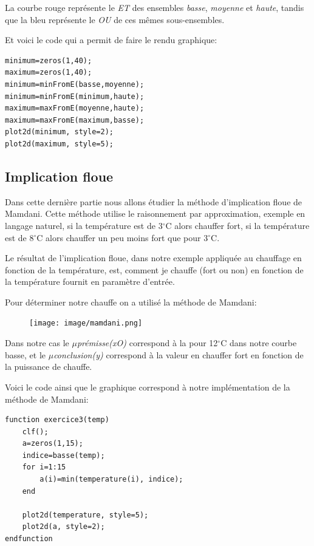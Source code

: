 \documentclass[a4paper,12pt]{report}
\begin{document}
La courbe rouge représente le \textit{ET} des ensembles \textit{basse}, \textit{moyenne} et \textit{haute}, tandis que la bleu représente le \textit{OU} de ces mêmes sous-ensembles.

Et voici le code qui a permit de faire le rendu graphique:
\begin{lstlisting}[style=Scilab,caption={Code question 2.1},label=lst:e2q1]    
minimum=zeros(1,40);
maximum=zeros(1,40);    
minimum=minFromE(basse,moyenne);
minimum=minFromE(minimum,haute);
maximum=maxFromE(moyenne,haute);
maximum=maxFromE(maximum,basse);
plot2d(minimum, style=2);
plot2d(maximum, style=5);
\end{lstlisting}


\subsection*{Implication floue}

Dans cette dernière partie nous allons étudier la méthode d'implication floue de Mamdani. Cette méthode utilise le raisonnement par approximation, exemple en langage naturel, si la température est de 3$^{\circ}$C alors chauffer fort, si la température est de 8$^{\circ}$C alors chauffer un peu moins fort que pour 3$^{\circ}$C.

Le résultat de l'implication floue, dans notre exemple appliquée au chauffage en fonction de la température, est, comment je chauffe (fort ou non) en fonction de la température fournit en paramètre d'entrée.

Pour déterminer notre chauffe on a utilisé la méthode de Mamdani:
\begin{figure}[!ht]
	\center	
	\texttt{[image: image/mamdani.png]}
\end{figure} 

Dans notre cas le $\mu$\textit{prémisse(xO)} correspond à la pour 12$^{\circ}$C dans notre courbe basse, et le $\mu$\textit{conclusion(y)} correspond à la valeur en chauffer fort en fonction de la puissance de chauffe.

Voici le code ainsi que le graphique correspond à notre implémentation de la méthode de Mamdani:

\begin{lstlisting}[style=Scilab,caption={Code question 3},label=lst:e3]    
function exercice3(temp)
    clf();
    a=zeros(1,15);
    indice=basse(temp);
    for i=1:15
        a(i)=min(temperature(i), indice);
    end    
    
    plot2d(temperature, style=5);
    plot2d(a, style=2);
endfunction
\end{lstlisting}
\end{document}
